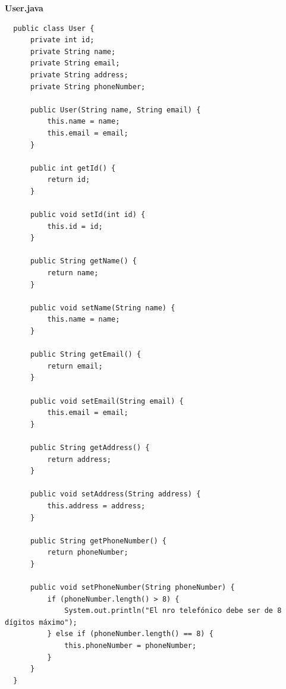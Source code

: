 \documentclass{article}
\begin{document}
\textbf{User.java}
\begin{verbatim}
  public class User {
      private int id;
      private String name;
      private String email;
      private String address;
      private String phoneNumber;

      public User(String name, String email) {
          this.name = name;
          this.email = email;
      }

      public int getId() {
          return id;
      }

      public void setId(int id) {
          this.id = id;
      }

      public String getName() {
          return name;
      }

      public void setName(String name) {
          this.name = name;
      }

      public String getEmail() {
          return email;
      }

      public void setEmail(String email) {
          this.email = email;
      }

      public String getAddress() {
          return address;
      }

      public void setAddress(String address) {
          this.address = address;
      }

      public String getPhoneNumber() {
          return phoneNumber;
      }

      public void setPhoneNumber(String phoneNumber) {
          if (phoneNumber.length() > 8) {
              System.out.println("El nro telefónico debe ser de 8 dígitos máximo");
          } else if (phoneNumber.length() == 8) {
              this.phoneNumber = phoneNumber;
          }
      }
  }
\end{verbatim}
\end{document}
